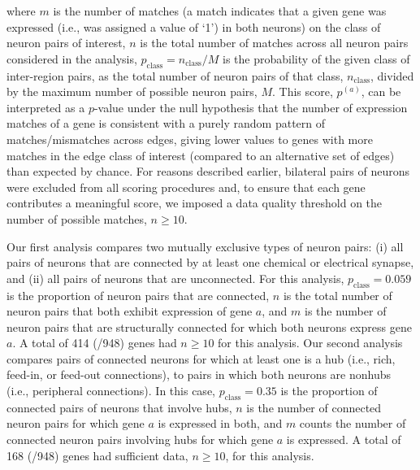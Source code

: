 \documentclass[10pt,letterpaper]{article}
\begin{document}
where $m$ is the number of matches (a match indicates that a given gene was expressed (i.e., was assigned a value of `1') in both neurons) on the class of neuron pairs of interest, $n$ is the total number of matches across all neuron pairs considered in the analysis, $p_\mathrm{class} = n_\mathrm{class}/M$ is the probability of the given class of inter-region pairs, as the total number of neuron pairs of that class, $n_\mathrm{class}$, divided by the maximum number of possible neuron pairs, $M$.
This score, $p^{(a)}$, can be interpreted as a $p$-value under the null hypothesis that the number of expression matches of a gene is consistent with a purely random pattern of matches/mismatches across edges, giving lower values to genes with more matches in the edge class of interest (compared to an alternative set of edges) than expected by chance.
For reasons described earlier, bilateral pairs of neurons were excluded from all scoring procedures and, to ensure that each gene contributes a meaningful score, we imposed a data quality threshold on the number of possible matches, $n \geq 10$.

Our first analysis compares two mutually exclusive types of neuron pairs:
(i) all pairs of neurons that are connected by at least one chemical or electrical synapse, and
(ii) all pairs of neurons that are unconnected.
For this analysis, $p_\mathrm{class} = 0.059$ is the proportion of neuron pairs that are connected, $n$ is the total number of neuron pairs that both exhibit expression of gene $a$, and $m$ is the number of neuron pairs that are structurally connected for which both neurons express gene $a$.
A total of 414 (/948) genes had $n \geq 10$ for this analysis.
Our second analysis compares pairs of connected neurons for which at least one is a hub (i.e., rich, feed-in, or feed-out connections), to pairs in which both neurons are nonhubs (i.e., peripheral connections).
In this case, $p_\mathrm{class} = 0.35$ is the proportion of connected pairs of neurons that involve hubs, $n$ is the number of connected neuron pairs for which gene $a$ is expressed in both, and $m$ counts the number of connected neuron pairs involving hubs for which gene $a$ is expressed.
A total of 168 (/948) genes had sufficient data, $n \geq 10$, for this analysis.
\end{document}
